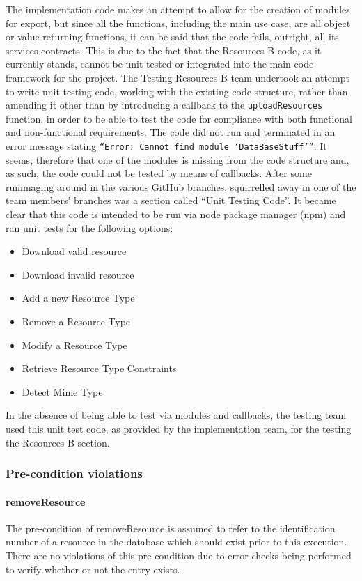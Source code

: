 \documentclass[a4paper]{article}
\begin{document}


The implementation code makes an attempt to allow for the creation of modules for export, but since all the functions, including the main use case, are all object or value-returning functions, it can be said that the code fails, outright, all its services contracts. This is due to the fact that the Resources B code, as it currently stands, cannot be unit tested or integrated into the main code framework for the project. 
The Testing Resources B team undertook an attempt to write unit testing code, working with the existing code structure, rather than amending it other than by introducing a callback to the \texttt{uploadResources} function, in order to be able to test the code for compliance with both functional and non-functional requirements. The code did not run and terminated in an error message stating \texttt{“Error: Cannot find module ‘DataBaseStuff’”}. It seems, therefore that one of the modules is missing from the code structure and, as such, the code could not be tested by means of callbacks.
After some rummaging around in the various GitHub branches, squirrelled away in one of the team members’ branches was a section called “Unit Testing Code”. It became clear that this code is intended to be run via node package manager (npm) and ran unit tests for the following options: 
\begin{itemize}
\item	Download valid resource
\item	Download invalid resource
\item	Add a new Resource Type
\item	Remove a Resource Type
\item	Modify a Resource Type
\item	Retrieve Resource Type Constraints
\item	Detect Mime Type
\end{itemize}
In the absence of being able to test via modules and callbacks, the testing team used this unit test code, as provided by the implementation team, for the testing the Resources B section.
\subsubsection {Pre-condition violations}

\paragraph{removeResource}
The pre-condition of removeResource is assumed to refer to the identification number of a resource in the database which should exist prior to this execution. There are no violations of this pre-condition due to error checks being performed to verify whether or not the entry exists.
\end{document}
